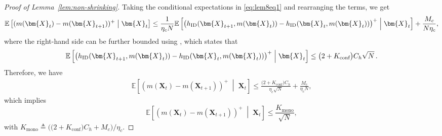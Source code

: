 \documentclass{article}
\theoremstyle{plain}
\theoremstyle{remark}
\newcommand{\givenmiddle}{\;\middle|\;}
\newcommand{\ID}{\textnormal{ID}}
\newcommand{\conf}{\text{conf}}
\newcommand{\mono}{\text{mono}}
\def\mX{{\bm{X}}}
\newcommand{\EE}{\mathbb{E}}
\newcommand{\bracket}[1]{\left(#1\right)}
\newcommand{\mbracket}[1]{\left[#1\right]}
\begin{document}
\begin{proof}[Proof of Lemma~\ref{lem:non-shrinking}]
    Taking the conditional expectations in \eqref{eq:lem8eq1} and rearranging the terms, we get
    \begin{align*}
       \EE\mbracket{(m(\mX_t)-m(\mX_{t+1}))^+\givenmiddle\mX_t}\leq \frac{1}{\eta_c N}\EE\mbracket{\bracket{h_{\ID}(\mX_{t+1},m(\mX_t))-h_{\ID}(\mX_t,m(\mX_t))}^+\givenmiddle\mX_t} + \frac{M_c}{N\eta_c}, 
    \end{align*}
    where the right-hand side can be further bounded using , which states that
    \begin{align*}
        \EE\mbracket{\bracket{h_{\ID}(\mX_{t+1},m(\mX_t))-h_{\ID}(\mX_t,m(\mX_t))}^+\givenmiddle\mX_t}\leq \big(2 + K_{\conf}\big) C_h\sqrt{N}\,.
    \end{align*}
    Therefore, we have
    \begin{align*}
        \EE\mbracket{(m(\mX_t)-m(\mX_{t+1}))^+\givenmiddle\mX_t}\leq  \frac{\big(2 + K_{\conf}\big) C_h}{\eta_c \sqrt{N}}+\frac{M_c}{\eta_c N},
    \end{align*}
    which implies 
    \[
        \EE\mbracket{(m(\mX_t)-m(\mX_{t+1}))^+\givenmiddle\mX_t} \leq \frac{K_{\mono}}{\sqrt{N}}, 
    \]
    with $K_{\mono} \triangleq \Big(\big(2 + K_{\conf}\big) C_h  + M_c \Big) / \eta_c$. 
\end{proof}
\end{document}
